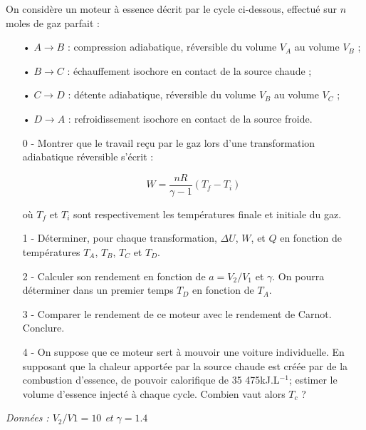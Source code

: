 \documentclass{report}
\begin{document}
On considère un moteur à essence décrit par le cycle ci-dessous, effectué sur $n$ moles de gaz parfait :

\begin{itemize}

\item[•]$A \rightarrow B$ : compression adiabatique, réversible du volume $V_A$ au volume $V_B$ ;
\item[•]$B \rightarrow C$ : échauffement isochore en contact de la source chaude ;
\item[•]$C \rightarrow D$ : détente adiabatique, réversible du volume $V_B$ au volume $V_C$ ;
\item[•]$D \rightarrow A$ :  refroidissement isochore en contact de la source froide.

\end{itemize}

\begin{itemize}

	\item[0 -] Montrer que le travail reçu par le gaz lors d'une transformation adiabatique réversible s'écrit :
	
\begin{equation}
	W = \frac{nR}{\gamma - 1}(T_f - T_i)
\end{equation}	

où $T_f$ et $T_i$ sont respectivement les températures finale et initiale du gaz.

	\item[1 -] Déterminer, pour chaque transformation, $\Delta U$, $W$, et $Q$ en fonction de températures $T_A$, $T_B$, $T_C$ et $T_D$. 
	\item[2 -] Calculer son rendement en fonction de $a=V_2/V_1$ et $\gamma$. On pourra déterminer dans un premier temps $T_D$ en fonction de $T_A$.
	\item[3 -]  Comparer le rendement de ce moteur avec le rendement de Carnot. Conclure.
	
	\item[4 -] On suppose que ce moteur sert à mouvoir une voiture individuelle. En supposant que la chaleur apportée par la source chaude est créée par de la combustion d'essence, de pouvoir calorifique de 35 475kJ.L$^{-1}$; estimer le volume d'essence injecté à chaque cycle. Combien vaut alors $T_c$ ?
	
\end{itemize}

\textit{Données : $ V_{2}/V{1} = 10$ et $ \gamma=1.4$}
\end{document}
